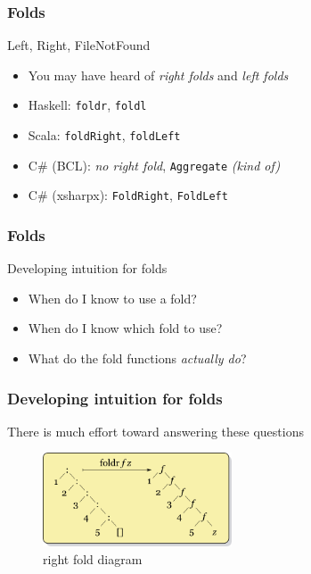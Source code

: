 \begin{frame}
\frametitle{Folds}
\begin{block}{Left, Right, FileNotFound}
\begin{itemize}
\item<1-> You may have heard of \emph{right folds} and \emph{left folds}
\item<2-> Haskell: \lstinline{foldr}, \lstinline{foldl}
\item<2-> Scala: \lstinline{foldRight}, \lstinline{foldLeft}
\item<2-> C\# (BCL): \emph{no right fold}, \lstinline{Aggregate} \emph{(kind of)} 
\item<2-> C\# (xsharpx): \lstinline{FoldRight}, \lstinline{FoldLeft} 
\end{itemize}
\end{block}
\end{frame}

\begin{frame}
\frametitle{Folds}
\begin{block}{Developing intuition for folds}
\begin{itemize}
\item<1-> When do I know to use a fold?
\item<2-> When do I know which fold to use?
\item<3-> What do the fold functions \emph{actually do}?
\end{itemize}
\end{block}
\end{frame}

\begin{frame}
\frametitle{Developing intuition for folds}
\begin{block}{There is much effort toward answering these questions}
\begin{figure}
\centering
\includegraphics[width=0.5\textwidth]{image/Right-fold-transformation.png}
\caption{right fold diagram}
\end{figure}
\end{block}
\end{frame}

